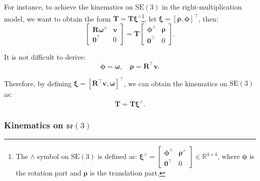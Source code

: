 For instance, to achieve the kinematics on $\mathrm{SE}(3)$ in the right-multiplication model, we want to obtain the form $\dot{\mathbf{T}} = \mathbf{T} \boldsymbol{\xi}^\wedge$\footnote{The $\wedge$ symbol on $\mathrm{SE}(3)$ is defined as: $\boldsymbol{\xi}^\wedge = \begin{bmatrix}
		\boldsymbol{\phi}^\wedge & \boldsymbol{\rho}^\wedge \\ \mathbf{0}^\top & 0
	\end{bmatrix} \in \mathbb{R}^{4 \times 4}$, where $\boldsymbol{\phi}$ is the rotation part and $\boldsymbol{\rho}$ is the translation part.}, let $\boldsymbol{\xi} = [\boldsymbol{\rho}, 
\boldsymbol{\phi}]^\top$, then:
\begin{equation}\label{key}
	\begin{bmatrix}
		\mathbf{R} \boldsymbol{\omega}^\wedge & \mathbf{v} \\
		\mathbf{0} ^\top & 0
	\end{bmatrix}
	= \mathbf{T} \begin{bmatrix}
		\boldsymbol{\phi}^\wedge & \boldsymbol{\rho} \\
		\mathbf{0}^\top & 0
	\end{bmatrix}.
\end{equation}

It is not difficult to derive:
\begin{equation}\label{key}
	\boldsymbol{\phi} = \boldsymbol{\omega}, \quad \boldsymbol{\rho} = \boldsymbol{R}^\top \mathbf{v}.
\end{equation}

Therefore, by defining $\boldsymbol{\xi} = [\mathbf{R}^\top \mathbf{v}, 
\boldsymbol{\omega}]^\top$, we can obtain the kinematics on $\mathrm{SE}(3)$ as:
\begin{equation}\label{key}
	\dot{\mathbf{T}} = \mathbf{T} \boldsymbol{\xi}^\wedge.
\end{equation}

\subsubsection{Kinematics on $\mathfrak{se}(3)$}

